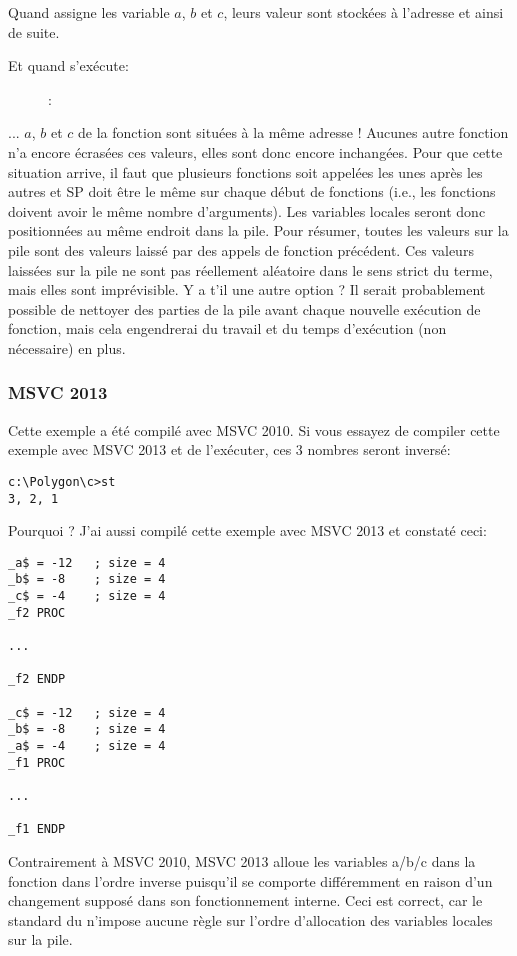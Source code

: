 Quand  assigne les variable $a$, $b$ et $c$, leurs valeur sont stockées à l'adresse  et ainsi de suite.

\clearpage
Et quand  s'exécute:

\begin{figure}[H]
\centering
{}
\caption{\olly: }
\label{fig:stack_noise_olly2}
\end{figure}

... $a$, $b$ et $c$ de la fonction  sont situées à la même adresse !
Aucunes autre fonction n'a encore écrasées ces valeurs, elles sont donc encore inchangées. Pour que cette situation arrive, il faut que plusieurs fonctions soit appelées les unes après les autres et \ac{SP} doit être le même sur chaque début de fonctions (i.e., les fonctions doivent avoir le même nombre d'arguments). Les variables locales seront donc positionnées au même endroit dans la pile. Pour résumer, toutes les valeurs sur la pile sont des valeurs laissé par des appels de fonction précédent. Ces valeurs laissées sur la pile ne sont pas réellement aléatoire dans le sens strict du terme, mais elles sont imprévisible. 
Y a t'il une autre option ?
Il serait probablement possible de nettoyer des parties de la pile avant chaque nouvelle exécution de fonction, mais cela engendrerai du travail et du temps d'exécution (non nécessaire) en plus.

\subsubsection{MSVC 2013}

Cette exemple a été compilé avec MSVC 2010.
Si vous essayez de compiler cette exemple avec MSVC 2013 et de l'exécuter, ces 3 nombres seront inversé:%

\begin{lstlisting}
c:\Polygon\c>st
3, 2, 1
\end{lstlisting}

Pourquoi ?
J'ai aussi compilé cette exemple avec MSVC 2013 et constaté ceci: 


\begin{lstlisting}[caption=MSVC 2013,style=customasmx86]
_a$ = -12	; size = 4
_b$ = -8	; size = 4
_c$ = -4	; size = 4
_f2	PROC

...

_f2	ENDP

_c$ = -12	; size = 4
_b$ = -8	; size = 4
_a$ = -4	; size = 4
_f1	PROC

...

_f1	ENDP
\end{lstlisting}

Contrairement à MSVC 2010, MSVC 2013 alloue les variables a/b/c dans la fonction  dans l'ordre inverse puisqu'il se comporte différemment en raison d'un changement supposé dans son fonctionnement interne.%
Ceci est correct, car le standard du \CCpp n'impose aucune règle sur l'ordre d'allocation des variables locales sur la pile.

